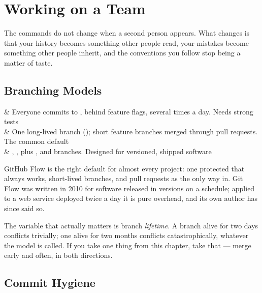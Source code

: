 \chapter{Working on a Team}\label{ch:git-team}

The commands do not change when a second person appears. What changes is that
your history becomes something other people read, your mistakes become
something other people inherit, and the conventions you follow stop being a
matter of taste.

\section{Branching Models}\label{sec:git-models}

\begin{keys}[0.26]
	  & Everyone commits to , behind feature flags, several times a day. Needs strong tests \\
	  & One long-lived branch (); short feature branches merged through pull requests. The common default \\
	     & , , plus ,  and  branches. Designed for versioned, shipped software \\
\end{keys}

\begin{moral}
	GitHub Flow is the right default for almost every project: one protected
	 that always works, short-lived branches, and pull requests as the
	only way in. Git Flow was written in 2010 for software released in versions on
	a schedule; applied to a web service deployed twice a day it is pure overhead,
	and its own author has since said so.
\end{moral}

\begin{note}
	The variable that actually matters is branch \emph{lifetime}. A branch alive
	for two days conflicts trivially; one alive for two months conflicts
	catastrophically, whatever the model is called. If you take one thing from this
	chapter, take that --- merge early and often, in both directions.
\end{note}

\section{Commit Hygiene}\label{sec:git-hygiene}

